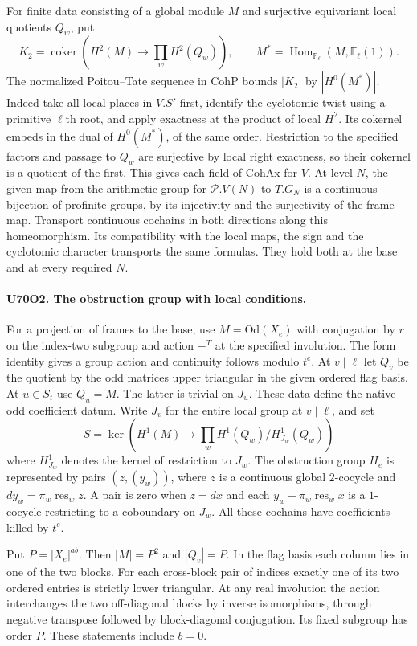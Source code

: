For finite data consisting of a global module $M$ and surjective
equivariant local quotients $Q_w$, put
\[
 K_2=\operatorname{coker}\!\left(H^2(M)\longrightarrow
         \prod_w H^2(Q_w)\right),\qquad
 M^*=\operatorname{Hom}_{\mathbb F_\ell}(M,\mathbb F_\ell(1)).
\]
The normalized Poitou--Tate sequence in $\mathrm{CohP}$ bounds
$|K_2|$ by $|H^0(M^*)|$. Indeed take all local places in $V.S'$
first, identify the cyclotomic twist using a primitive $\ell$th
root, and apply exactness at the product of local $H^2$. Its
cokernel embeds in the dual of $H^0(M^*)$, of the same order.
Restriction to the specified factors and passage to $Q_w$ are
surjective by local right exactness, so their cokernel is a
quotient of the first. This gives each field of $\mathrm{CohAx}$
for $V$. At level $N$, the given map from the arithmetic group
for $\mathcal P.V(N)$ to $T.G_N$ is a continuous bijection of
profinite groups, by its injectivity and the surjectivity of
the frame map. Transport continuous cochains in both directions
along this homeomorphism. Its compatibility with the local maps,
the sign and the cyclotomic character transports the same formulas.
They hold both at the base and at every required $N$.

\paragraph{U70O2. The obstruction group with local conditions.}
For a projection of frames to the base, use $M=\mathrm{Od}(X_e)$
with conjugation by $r$ on the index-two subgroup and action
$-{}^T$ at the specified involution. The form identity gives a
group action and continuity follows modulo $t^e$. At $v\mid\ell$
let $Q_v$ be the quotient by the odd matrices upper triangular
in the given ordered flag basis. At $u\in S_t$ use $Q_u=M$.
The latter is trivial on $J_u$. These data define the native
odd coefficient datum. Write $J_v$ for the entire local group at
$v\mid\ell$, and set
\[
 S=\ker\!\left(H^1(M)\to\prod_w H^1(Q_w)/H^1_{J_w}(Q_w)\right)
\]
where $H^1_{J_w}$ denotes the kernel of restriction to $J_w$.
The obstruction group $H_e$ is represented by pairs $(z,(y_w))$,
where $z$ is a continuous global $2$-cocycle and
$d y_w=\pi_w\operatorname{res}_w z$. A pair is zero when
$z=d x$ and each $y_w-\pi_w\operatorname{res}_w x$ is a
$1$-cocycle restricting to a coboundary on $J_w$.
All these cochains have coefficients killed by $t^e$.

Put $P=|X_e|^{ab}$. Then $|M|=P^2$ and $|Q_v|=P$.
In the flag basis each column lies in one of the two blocks.
For each cross-block pair of indices exactly one of its two
ordered entries is strictly lower triangular. At any real
involution the action interchanges the two off-diagonal blocks
by inverse isomorphisms, through negative transpose followed by
block-diagonal conjugation. Its fixed subgroup has order $P$.
These statements include $b=0$.


